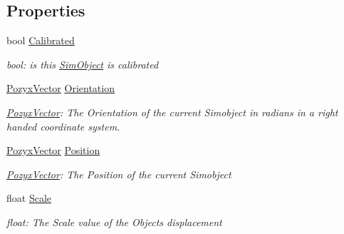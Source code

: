 \subsection*{Properties}
\begin{DoxyCompactItemize}
\item 
bool \hyperlink{class_pozyx_positioner_1_1_framework_1_1_sim_object_a6bcf32032872002b9edb17f0efc86eef}{Calibrated}
\begin{DoxyCompactList}\small\item\em bool\+: is this \hyperlink{class_pozyx_positioner_1_1_framework_1_1_sim_object}{Sim\+Object} is calibrated \end{DoxyCompactList}\item 
\hyperlink{struct_pozyx_positioner_1_1_framework_1_1_pozyx_vector}{Pozyx\+Vector} \hyperlink{class_pozyx_positioner_1_1_framework_1_1_sim_object_af589d7d7066efe823f8a2decd5b081da}{Orientation}
\begin{DoxyCompactList}\small\item\em \hyperlink{struct_pozyx_positioner_1_1_framework_1_1_pozyx_vector}{Pozyx\+Vector}\+: The Orientation of the current Simobject in radians in a right handed coordinate system. \end{DoxyCompactList}\item 
\hyperlink{struct_pozyx_positioner_1_1_framework_1_1_pozyx_vector}{Pozyx\+Vector} \hyperlink{class_pozyx_positioner_1_1_framework_1_1_sim_object_a1d2b2ac8c37883939483d4682826db21}{Position}
\begin{DoxyCompactList}\small\item\em \hyperlink{struct_pozyx_positioner_1_1_framework_1_1_pozyx_vector}{Pozyx\+Vector}\+: The Position of the current Simobject \end{DoxyCompactList}\item 
float \hyperlink{class_pozyx_positioner_1_1_framework_1_1_sim_object_ab9f89c4e327e25286f0269960d0d2de8}{Scale}
\begin{DoxyCompactList}\small\item\em float\+: The Scale value of the Object\textquotesingle{}s displacement \end{DoxyCompactList}\end{DoxyCompactItemize}
